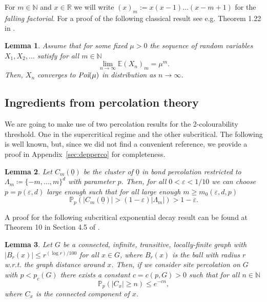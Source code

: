 \documentclass[11pt]{article}%
\newtheorem{lemma}[lemma]{Lemma}
\newcommand{\eps}{\varepsilon}
\newcommand{\RR}{\mathbb{R}}
\newcommand{\NN}{\mathbb{N}}
\newcommand{\Pro}{\mathbb{P}}
\newcommand{\Ex}{\mathbb{E}}
\newcommand{\typ}{\underline{0}}
\begin{document}
\noindent
For $ m\in \NN $ and $ x\in \RR $ we will write  $ (x)_m:=x(x-1)\dots (x-m+1) $ for the {\em falling factorial}. 
For a proof of the following classical result see e.g. Theorem 1.22 in \cite{Bollobas2001RandomGraphs}.

\begin{lemma}\label{fallingmethod}
	Assume that for some fixed $ \mu>0 $ the sequence of random variables $ X_1,X_2,\dots $ satisfy for all $ m\in \NN $
	\begin{equation*}
		\lim_{n \to \infty} \Ex (X_n)_m = \mu^m.
	\end{equation*}
	Then, $ X_n $ converges to $ \emph{\text{Poi}}(\mu) $ in distribution as $ n\to\infty $.
\end{lemma}



\subsection{Ingredients from percolation theory}


We are going to make use of two percolation results for the 2-colourability threshold. 
One in the supercritical regime and the other subcritical. The following is well known, but,
since we did not find a convenient reference, we provide a proof in Appendix~\ref{sec:depperco} for completeness.

\begin{lemma}\label{dependentperco}
	Let $ C_m(\typ) $ be the cluster of $ \typ $ in bond percolation restricted to $ \Lambda_m\coloneqq \{-m,\dots,m \}^d $ with parameter $ p $. Then, for all $ 0<\eps <1/10$ we can choose $ p=p(\eps,d) $ large enough such that for all large enough $ m\geq m_0(\eps,d,p) $ 
	\begin{equation*}
		\Pro_p(|C_m(\typ)|>(1-\eps)|\Lambda_m|)>1-\eps.
	\end{equation*}
\end{lemma}

\noindent
 A proof for the following subcritical exponential decay result can be found at Theorem 10 in Section 4.5 of \cite{bollobas2006percolation}. 
\begin{lemma}\label{bolloexpdecay}
    Let $G$ be a connected, infinite, transitive, locally-finite graph with $|B_r(x)|\leq r^{(\log r)/100} $ for all $x\in G$, where $B_r(x)$ is the ball with radius $r$ w.r.t. the graph distance around $x$. Then, if we consider site percolation on $G$ with $p<p_c(G)$ there exists a constant $c=c(p,G)>0$ such that for all $n\in \NN$
    \begin{equation*}
        \Pro_p(|C_x| \geq n)\leq e^{-cn},
    \end{equation*}
    where $C_x$ is the connected component of $x$.
\end{lemma}
\end{document}
